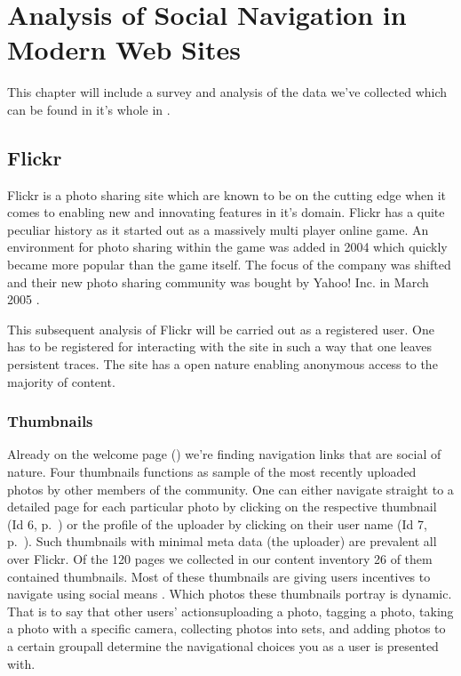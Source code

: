 \chapter{Analysis of Social Navigation in Modern Web Sites}
\label{chapter:analysis}

This chapter will include a survey and analysis of the data we've collected
which can be found in it's whole in
.

\section{Flickr}


Flickr is a photo sharing site which are known to be on the cutting edge when
it comes to enabling new and innovating features in it's domain. Flickr has a
quite peculiar history as it started out as a massively multi player online
game. An environment for photo sharing within the game was added in 2004 which
quickly became more popular than the game itself. The focus of the company was
shifted and their new photo sharing community was bought by Yahoo! Inc. in
March 2005 \citep[p.~257]{livingston07}.

This subsequent
analysis of Flickr will be carried out as a registered user. One has to be
registered for interacting with the site in such a way that one leaves
persistent traces. The site has a open nature enabling anonymous access
to the majority of content.

\subsection{Thumbnails}

Already on the welcome page ()
we're finding navigation links that are social of
nature. Four thumbnails functions as sample of the most recently uploaded
photos by other members of the community. One can either navigate straight to
a detailed page for each particular photo by clicking on the respective
thumbnail (Id 6, p.~\pageref{table:flickr.content.inventory.6})
or the profile of the uploader by clicking on their user
name (Id 7, p.~\pageref{table:flickr.content.inventory.7}). Such thumbnails
with minimal meta data (the uploader) are prevalent all over Flickr. Of the
120 pages we collected in our content inventory 26 of them contained
thumbnails. Most of these thumbnails
are giving users incentives to navigate using social means%
.
Which photos these thumbnails portray is dynamic. That is to say that other
users' actions\dash{}uploading a photo, tagging a photo, taking a photo with a
specific camera, collecting photos into sets, and adding photos to a certain
group\dash{}all determine the navigational choices you as a user is
presented with.

